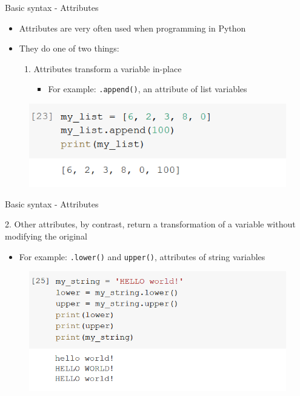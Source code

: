 \documentclass[aspectratio=169]{beamer}
\begin{document}
\begin{frame}{Basic syntax - Attributes}

	\begin{itemize}
		\item Attributes are very often used when programming in Python
		\item They do one of two things:
			\begin{enumerate}
				\item Attributes transform a variable in-place
				\begin{itemize}
					\item For example: \texttt{.append()}, an attribute of list variables
				\end{itemize}
			\end{enumerate}
	\end{itemize}

	\begin{figure}
		\centering
		\includegraphics[width=0.6\linewidth]{img/attributes_append.png}
	\end{figure}

\end{frame}

\begin{frame}{Basic syntax - Attributes}

	2. Other attributes, by contrast, return a transformation of a variable without modifying the original
		
	\begin{itemize}
		\item For example: \texttt{.lower()} and \texttt{upper()}, attributes of string variables
	\end{itemize}

	\begin{figure}
		\centering
		\includegraphics[width=0.6\linewidth]{img/string_lower_upper.png}
	\end{figure}

\end{frame}
\end{document}
